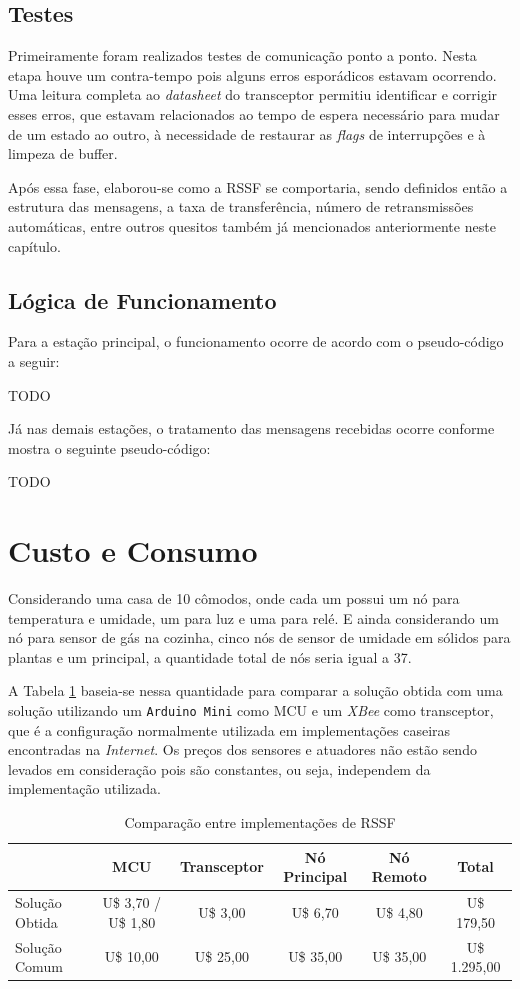 {\subsection{Testes}
Primeiramente foram realizados testes de comunicação ponto a ponto. Nesta etapa houve um contra-tempo pois
alguns erros esporádicos estavam ocorrendo. Uma leitura completa ao \textit{datasheet} do transceptor permitiu
identificar e corrigir esses erros, que estavam relacionados ao tempo de espera necessário para mudar de um
estado ao outro, à necessidade de restaurar as \textit{flags} de interrupções e à limpeza de buffer.

Após essa fase, elaborou-se como a RSSF se comportaria, sendo definidos então a estrutura das mensagens, a
taxa de transferência, número de retransmissões automáticas, entre outros quesitos também já mencionados
anteriormente neste capítulo.

\subsection{Lógica de Funcionamento}
Para a estação principal, o funcionamento ocorre de acordo com o pseudo-código a seguir:

TODO

Já nas demais estações, o tratamento das mensagens recebidas ocorre conforme mostra o seguinte pseudo-código:

TODO

\section{Custo e Consumo}
Considerando uma casa de 10 cômodos, onde cada um possui um nó para temperatura e umidade, um para luz e uma
para relé. E ainda considerando um nó para sensor de gás na cozinha, cinco nós de sensor de umidade em sólidos
para plantas e um principal, a quantidade total de nós seria igual a 37.

A Tabela \ref{quadro:compare} baseia-se nessa quantidade para comparar a solução obtida com uma solução
utilizando um \texttt{Arduino Mini} como MCU e um \textit{XBee} como transceptor, que é a configuração
normalmente utilizada em implementações caseiras encontradas na \textit{Internet}. Os preços dos sensores e
atuadores não estão sendo levados em consideração pois são constantes, ou seja, independem da implementação
utilizada.

\begin{table}[H]
	\centering
	\resizebox{\textwidth}{!} {
		\begin{tabular}{l|c|c|c|c|c|}
		\cline{2-6}
		& MCU & Transceptor & Nó Principal & Nó Remoto & Total \\ \hline
		\multicolumn{1}{|l|}{Solução Obtida} & U\$ 3,70 / U\$ 1,80 & U\$ 3,00    & U\$ 6,70     & U\$ 4,80  & U\$ 179,50    \\ \hline
		\multicolumn{1}{|l|}{Solução Comum}  & U\$ 10,00         & U\$ 25,00   & U\$ 35,00    & U\$ 35,00 & U\$ 1.295,00 \\ \hline
		\end{tabular}
	}
	\caption{Comparação entre implementações de RSSF}
	\label{quadro:compare}
\end{table}

}
